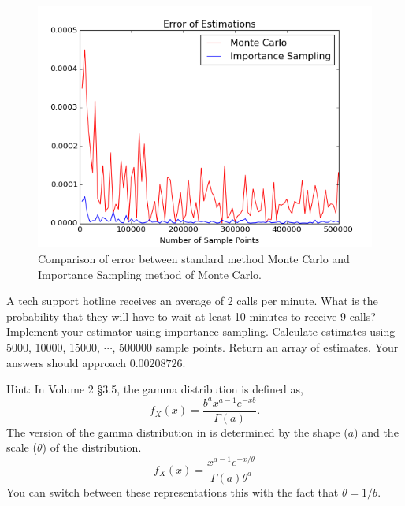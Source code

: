 \begin{figure}[H]
\includegraphics[width=\textwidth]{figures/MCvsIS.png}
\caption{Comparison of error between standard method Monte Carlo and Importance Sampling method of Monte Carlo.}
\label{fig:compare}
\end{figure}

\begin{problem} \label{prob:gamma}
A tech support hotline receives an average of 2 calls per minute. What is the probability that they will have to wait at least 10 minutes to receive 9 calls? Implement your estimator using importance sampling. Calculate estimates using 5000, 10000, 15000, $\cdots$, 500000 sample points. Return an array of estimates. Your answers should approach $0.00208726$.

Hint: In Volume 2 \S 3.5, the gamma distribution is defined as, $$f_X(x) = \frac{b^{a}x^{a-1}e^{-xb}}{\Gamma(a)}.$$ The version of the gamma distribution in  is determined by the shape ($a$) and the scale ($\theta$) of the distribution. $$f_X(x) = \frac{x^{a-1}e^{-x/\theta}}{\Gamma(a)\theta^a}$$
You can switch between these representations this with the fact that $\theta = 1/b$.
\end{problem}

